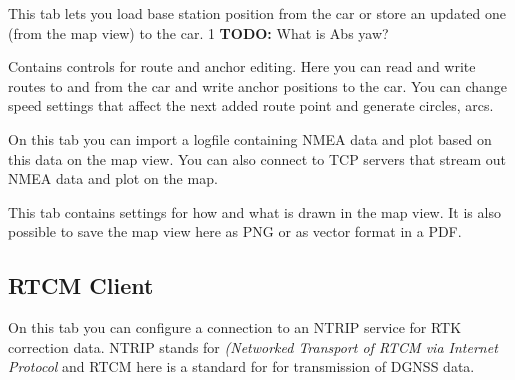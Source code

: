 \documentclass[12pt]{article} %
\def\printtodos{0}
\newcommand{\todo}[1]{
  \if\printtodos1
      {\color{red} \textbf{TODO:} #1}
  \fi}
\begin{document}
\vspace{5mm}

 This tab lets you load base station position from the car or
store an updated one (from the map view) to the car. \todo{What is Abs
  yaw?}

 Contains controls for route and anchor editing. Here
you can read and write routes to and from the car and write anchor
positions to the car.  You can change speed settings that affect the
next added route point and generate circles, arcs.

 On this tab you can import a logfile containing NMEA
data and plot based on this data on the map view.  You can also
connect to TCP servers that stream out NMEA data and plot on the map.

 This tab contains settings for how and what is drawn
in the map view.  It is also possible to save the map view here as PNG
or as vector format in a PDF.


  
\subsection{RTCM Client}\label{sec:RTCM}

On this tab you can configure a connection to an NTRIP service for RTK correction data.
  NTRIP stands for {\em (Networked Transport of RTCM via Internet Protocol} and RTCM here is
  a standard for for transmission of DGNSS data.
  
\end{document}

